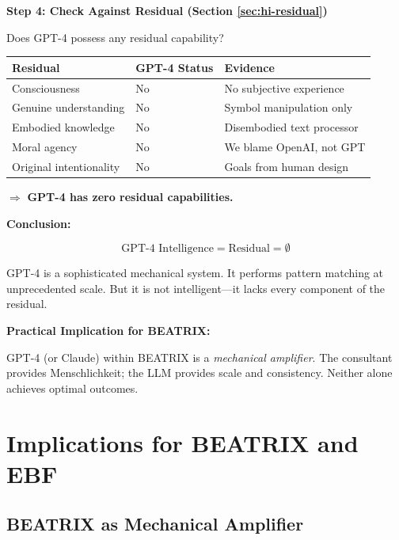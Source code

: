 \begin{tcolorbox}[colback=yellow!5!white, colframe=yellow!75!black,
    title=\textbf{Worked Example: Is GPT-4 ``Intelligent''?}]
\textbf{Step 4: Check Against Residual (Section \ref{sec:hi-residual})}

Does GPT-4 possess any residual capability?

\begin{center}
\begin{tabular}{lll}
\textbf{Residual} & \textbf{GPT-4 Status} & \textbf{Evidence} \\
\midrule
Consciousness & No & No subjective experience \\
Genuine understanding & No & Symbol manipulation only \\
Embodied knowledge & No & Disembodied text processor \\
Moral agency & No & We blame OpenAI, not GPT \\
Original intentionality & No & Goals from human design \\
\end{tabular}
\end{center}

$\Rightarrow$ \textbf{GPT-4 has zero residual capabilities.}

\textbf{Conclusion:}

\begin{equation}
\text{GPT-4 Intelligence} = \text{Residual} = \emptyset
\end{equation}

GPT-4 is a sophisticated mechanical system. It performs pattern matching at unprecedented scale. But it is not intelligent---it lacks every component of the residual.

\textbf{Practical Implication for BEATRIX:}

GPT-4 (or Claude) within BEATRIX is a \textit{mechanical amplifier}. The consultant provides Menschlichkeit; the LLM provides scale and consistency. Neither alone achieves optimal outcomes.

\end{tcolorbox}


\section{Implications for BEATRIX and EBF}
\label{sec:hi-implications}

\subsection{BEATRIX as Mechanical Amplifier}

